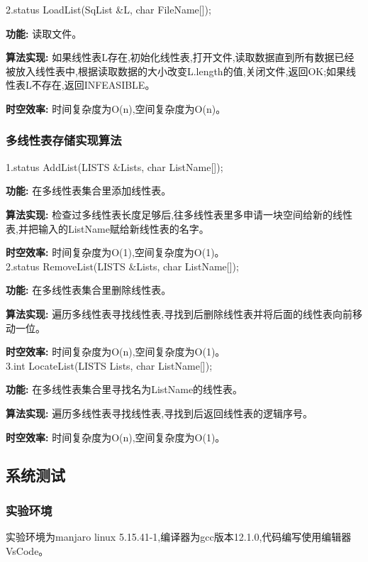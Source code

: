 \documentclass[supercite]{Experimental_Report}
\theoremstyle{definition}
\begin{document}
2.status LoadList(SqList \&L, char FileName[]);

\textbf{功能: }读取文件。

\textbf{算法实现: }如果线性表L存在,初始化线性表,打开文件,读取数据直到所有数据已经被放入线性表中,根据读取数据的大小改变L.length的值,关闭文件,返回OK;如果线性表L不存在,返回INFEASIBLE。

\textbf{时空效率: }时间复杂度为O(n),空间复杂度为O(n)。\\

\subsubsection{多线性表存储实现算法}

1.status AddList(LISTS \&Lists, char ListName[]);

\textbf{功能: }在多线性表集合里添加线性表。

\textbf{算法实现: }检查过多线性表长度足够后,往多线性表里多申请一块空间给新的线性表,并把输入的ListName赋给新线性表的名字。

\textbf{时空效率: }时间复杂度为O(1),空间复杂度为O(1)。\\

2.status RemoveList(LISTS \&Lists, char ListName[]);

\textbf{功能: }在多线性表集合里删除线性表。

\textbf{算法实现: }遍历多线性表寻找线性表,寻找到后删除线性表并将后面的线性表向前移动一位。

\textbf{时空效率: }时间复杂度为O(n),空间复杂度为O(1)。\\

3.int LocateList(LISTS Lists, char ListName[]);

\textbf{功能: }在多线性表集合里寻找名为ListName的线性表。

\textbf{算法实现: }遍历多线性表寻找线性表,寻找到后返回线性表的逻辑序号。

\textbf{时空效率: }时间复杂度为O(n),空间复杂度为O(1)。\\

\subsection{系统测试}

\subsubsection{实验环境}

实验环境为manjaro linux 5.15.41-1,编译器为gcc版本12.1.0,代码编写使用编辑器VsCode。
\end{document}
